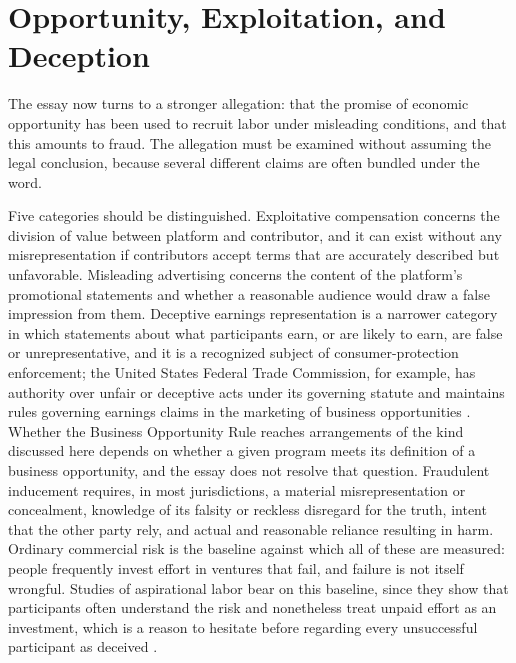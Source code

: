 \documentclass[11pt]{article}
\theoremstyle{remark}
\begin{document}
\section{Opportunity, Exploitation, and Deception}

The essay now turns to a stronger allegation: that the promise of economic opportunity has been used to recruit labor under misleading conditions, and that this amounts to fraud. The allegation must be examined without assuming the legal conclusion, because several different claims are often bundled under the word.

Five categories should be distinguished. Exploitative compensation concerns the division of value between platform and contributor, and it can exist without any misrepresentation if contributors accept terms that are accurately described but unfavorable. Misleading advertising concerns the content of the platform's promotional statements and whether a reasonable audience would draw a false impression from them. Deceptive earnings representation is a narrower category in which statements about what participants earn, or are likely to earn, are false or unrepresentative, and it is a recognized subject of consumer-protection enforcement; the United States Federal Trade Commission, for example, has authority over unfair or deceptive acts under its governing statute and maintains rules governing earnings claims in the marketing of business opportunities \cite{ftcact,ftcbor}. Whether the Business Opportunity Rule reaches arrangements of the kind discussed here depends on whether a given program meets its definition of a business opportunity, and the essay does not resolve that question. Fraudulent inducement requires, in most jurisdictions, a material misrepresentation or concealment, knowledge of its falsity or reckless disregard for the truth, intent that the other party rely, and actual and reasonable reliance resulting in harm. Ordinary commercial risk is the baseline against which all of these are measured: people frequently invest effort in ventures that fail, and failure is not itself wrongful. Studies of aspirational labor bear on this baseline, since they show that participants often understand the risk and nonetheless treat unpaid effort as an investment, which is a reason to hesitate before regarding every unsuccessful participant as deceived \cite{duffy2017}.
\end{document}
